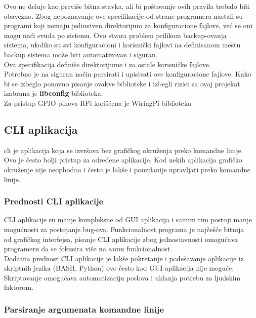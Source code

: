 Ovo ne deluje kao previše bitna stavka, ali bi poštovanje ovih pravila trebalo
biti obavezno.
Zbog nepoznavanje ove specifikacije od strane programera nastali su programi
koji nemaju jedinstven direktorijum za konfiguracione fajlove, već se oni mogu naći
svuda po sistemu.
Ovo stvara problem prilikom backup-ovanja sistema, ukoliko su svi konfiguracioni
i korisnički fajlovi na definisanom mestu backup sistema može biti automatizovan i siguran. \\
Ova specifikacija definiše direktorijume i za ostale korisničke fajlove. \\

Potrebno je na siguran način parsirati i upisivati ove konfiguracione fajlove.
Kako bi se izbeglo ponovno pisanje ovakve biblioteke i izbegli rizici za ovaj projekat izabrana je \textbf{libconfig}\cite{libconfig} biblioteka.\\

Za pristup GPIO pinova RPi korišćena je WiringPi\cite{WiringPi} biblioteka

\subsection{CLI aplikacija}

\gls{cli} je aplikacija koja se izvršava bez grafičkog okruženja preko komandne linije.
Ovo je često bolji pristup za određene aplikacije.
Kod nekih aplikacija grafičko okruženje nije neophodno i često je
lakše i pouzdanije upravljati preko komandne linije. \\

\subsubsection{Prednosti CLI aplikacije}
CLI aplikacije su manje kompleksne od GUI aplikacija i
samim tim postoji manje mogućnosti za postojanje bug-ova.
Funkcionalnost programa je najčešće bitnija od grafičkog interfejsa, pisanje CLI
aplikacije zbog jednostavnosti omogućava programeru da se fokusira više na samu
funkcionalnost. \\

Dodatna prednost CLI aplikacije je lakše pokretanje i podešavanje aplikacije iz
skriptnih jezika (BASH, Python) ovo često kod GUI aplikacija nije moguće.
Skriptovanje omogućava automatizaciju poslova i uklanja potrebu za ljudskim faktorom.\\

\subsubsection{Parsiranje argumenata komandne linije}

